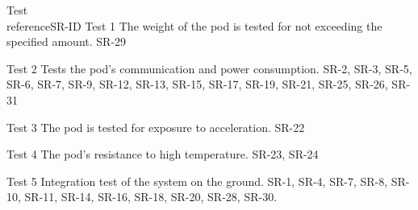 \documentclass[Main]{subfiles}
\begin{document}
\begin{TraceBackward}{Test\\reference}{SR-ID}
\TB
{Test 1}
{The weight of the pod is tested for not exceeding the specified amount.}
{SR-29}

\TB
{Test 2}
{Tests the pod's communication and power consumption.}
{SR-2, SR-3, SR-5, SR-6, SR-7, SR-9, SR-12, SR-13, SR-15, SR-17, SR-19, SR-21, SR-25, SR-26, SR-31}

\TB
{Test 3}
{The pod is tested for exposure to acceleration.}
{SR-22}

\TB
{Test 4}
{The pod's resistance to high temperature.}
{SR-23, SR-24}

\TB
{Test 5}
{Integration test of the system on the ground.}
{SR-1, SR-4, SR-7, SR-8, SR-10, SR-11, SR-14, SR-16, SR-18, SR-20, SR-28, SR-30.}

\end{TraceBackward}
\end{document}
